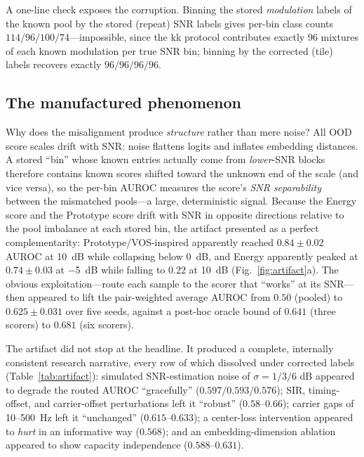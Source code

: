 \documentclass[review,12pt]{elsarticle}
\begin{document}
A one-line check exposes the corruption. Binning the stored
\emph{modulation} labels of the known pool by the stored (repeat) SNR
labels gives per-bin class counts $114/96/100/74$---impossible, since
the kk protocol contributes exactly $96$ mixtures of each known
modulation per true SNR bin; binning by the corrected (tile) labels
recovers exactly $96/96/96/96$.

\subsection{The manufactured phenomenon}

Why does the misalignment produce \emph{structure} rather than mere
noise? All OOD score scales drift with SNR: noise flattens logits and
inflates embedding distances. A stored ``bin'' whose known entries
actually come from \emph{lower}-SNR blocks therefore contains known
scores shifted toward the unknown end of the scale (and vice versa),
so the per-bin AUROC measures the score's \emph{SNR separability}
between the mismatched pools---a large, deterministic signal. Because
the Energy score and the Prototype score drift with SNR in opposite
directions relative to the pool imbalance at each stored bin, the
artifact presented as a perfect complementarity: Prototype/VOS-inspired
apparently reached $0.84 \pm 0.02$ AUROC at \SI{10}{dB} while
collapsing below \SI{0}{dB}, and Energy apparently peaked at
$0.74 \pm 0.03$ at \SI{-5}{dB} while falling to $0.22$ at \SI{10}{dB}
(Fig.~\ref{fig:artifact}a). The obvious exploitation---route each
sample to the scorer that ``works'' at its SNR---then appeared to lift
the pair-weighted average AUROC from $0.50$ (pooled) to
$0.625 \pm 0.031$ over five seeds, against a post-hoc oracle bound of
$0.641$ (three scorers) to $0.681$ (six scorers).

The artifact did not stop at the headline. It produced a complete,
internally consistent research narrative, every row of which dissolved
under corrected labels (Table~\ref{tab:artifact}):
simulated SNR-estimation noise of $\sigma = 1/3/6$ dB appeared to
degrade the routed AUROC ``gracefully'' ($0.597/0.593/0.576$);
SIR, timing-offset, and carrier-offset perturbations left it
``robust'' ($0.58$--$0.66$); carrier gaps of 10--\SI{500}{Hz} left it
``unchanged'' ($0.615$--$0.633$); a center-loss intervention appeared to
\emph{hurt} in an informative way ($0.568$); and an embedding-dimension
ablation appeared to show capacity independence ($0.588$--$0.631$).
\end{document}
